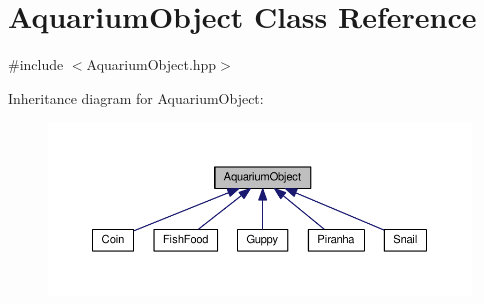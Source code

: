 \hypertarget{class_aquarium_object}{}\section{Aquarium\+Object Class Reference}
\label{class_aquarium_object}


{\ttfamily \#include $<$Aquarium\+Object.\+hpp$>$}



Inheritance diagram for Aquarium\+Object\+:
\nopagebreak
\begin{figure}[H]
\begin{center}
\leavevmode
\includegraphics[width=350pt]{class_aquarium_object__inherit__graph}
\end{center}
\end{figure}
